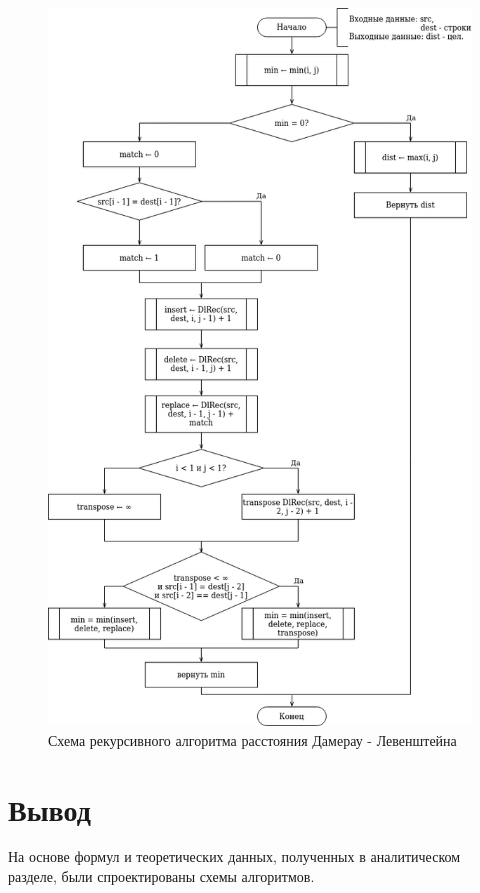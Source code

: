 \begin{figure}[h!]
	\begin{center}
		\includegraphics[scale=0.6]{assets/d-leven-recursive.png}
	\end{center}
	
	\caption{Схема рекурсивного алгоритма расстояния Дамерау - Левенштейна}
	\label{fig:d-recur}
\end{figure}

\section{Вывод}
На основе формул и теоретических данных, полученных в аналитическом разделе, были спроектированы схемы алгоритмов.